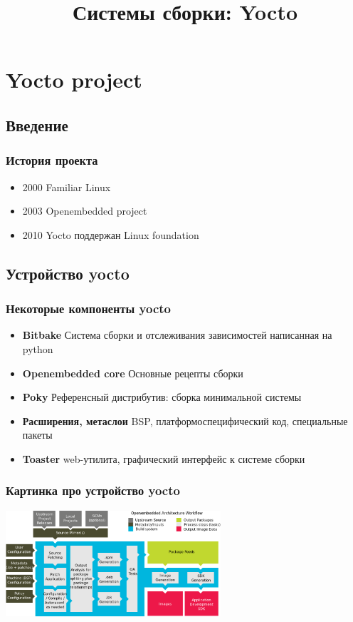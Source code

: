 
\title{Системы сборки: Yocto}



\begin{frame}
  \frametitle{}
  \titlepage
\end{frame}


\section{Yocto project}

\subsection{Введение}
\begin{frame}
  \frametitle{История проекта}
\begin{itemize}
  \item 2000 Familiar Linux
  \item 2003 Openembedded project
  \item 2010 Yocto поддержан Linux foundation 
\end{itemize}
\end{frame}

\subsection{Устройство yocto}
\begin{frame}
   \frametitle{Некоторые компоненты yocto}
   \begin{itemize}
     \item \textbf{Bitbake} Система сборки и отслеживания зависимостей написанная на python
     \item \textbf{Openembedded core} Основные рецепты сборки
     \item \textbf{Poky} Референсный дистрибутив: сборка минимальной системы
     \item \textbf{Расширения, метаслои} BSP, платформоспецифический код, специальные пакеты
     \item \textbf{Toaster} web-утилита, графический интерфейс к системе сборки
   \end{itemize}
\end{frame}

\begin{frame}
  \frametitle{Картинка про устройство yocto}
  \includegraphics[width=8cm]{yocto-environment.png}
\end{frame}

